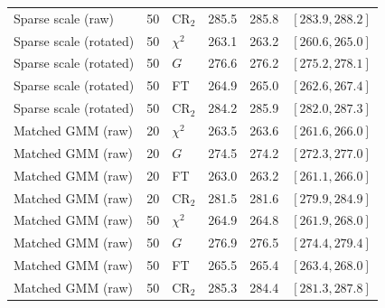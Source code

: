\begin{table}[t]
\begin{tabular}{lllrrr}
Sparse scale (raw) & 50 & CR$_2$ & 285.5 & 285.8 & $[283.9, 288.2]$ \\
Sparse scale (rotated) & 50 & $\chi^2$ & 263.1 & 263.2 & $[260.6, 265.0]$ \\
Sparse scale (rotated) & 50 & $G$ & 276.6 & 276.2 & $[275.2, 278.1]$ \\
Sparse scale (rotated) & 50 & FT & 264.9 & 265.0 & $[262.6, 267.4]$ \\
Sparse scale (rotated) & 50 & CR$_2$ & 284.2 & 285.9 & $[282.0, 287.3]$ \\
Matched GMM (raw) & 20 & $\chi^2$ & 263.5 & 263.6 & $[261.6, 266.0]$ \\
Matched GMM (raw) & 20 & $G$ & 274.5 & 274.2 & $[272.3, 277.0]$ \\
Matched GMM (raw) & 20 & FT & 263.0 & 263.2 & $[261.1, 266.0]$ \\
Matched GMM (raw) & 20 & CR$_2$ & 281.5 & 281.6 & $[279.9, 284.9]$ \\
Matched GMM (raw) & 50 & $\chi^2$ & 264.9 & 264.8 & $[261.9, 268.0]$ \\
Matched GMM (raw) & 50 & $G$ & 276.9 & 276.5 & $[274.4, 279.4]$ \\
Matched GMM (raw) & 50 & FT & 265.5 & 265.4 & $[263.4, 268.0]$ \\
Matched GMM (raw) & 50 & CR$_2$ & 285.3 & 284.4 & $[281.3, 287.8]$ \\
\bottomrule
\end{tabular}
\end{table}
